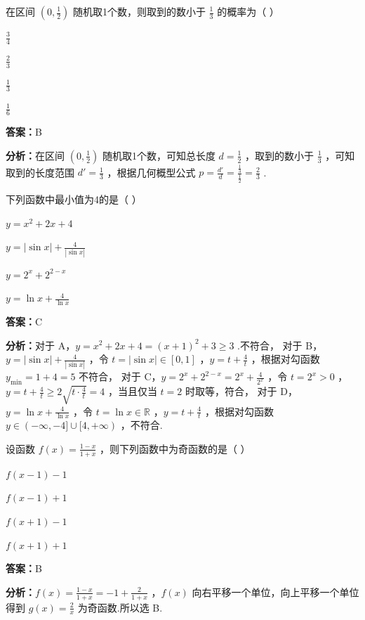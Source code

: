 \begin{question}[points=5]
在区间 $(0,\frac{1}{2})$ 随机取1个数，则取到的数小于 $\frac{1}{3}$ 的概率为（ ）
\begin{choices}
  \item $\frac{3}{4}$
  \item $\frac{2}{3}$
  \item $\frac{1}{3}$
  \item $\frac{1}{6}$
\end{choices}
\begin{solution}
\textbf{答案：}B

\textbf{分析：}在区间 $(0,\frac{1}{2})$ 随机取1个数，可知总长度 $d = \frac{1}{2}$ ，取到的数小于 $\frac{1}{3}$ ，可知取到的长度范围 $d' = \frac{1}{3}$ ，根据几何概型公式 $p = \frac{d'}{d} = \frac{\frac{1}{3}}{\frac{1}{2}} = \frac{2}{3}$ .
\end{solution}
\end{question}

\begin{question}[points=5]
下列函数中最小值为4的是（ ）
\begin{choices}
  \item $y = x^2 + 2x + 4$
  \item $y = |\sin x| + \frac{4}{|\sin x|}$
  \item $y = 2^x + 2^{2-x}$
  \item $y = \ln x + \frac{4}{\ln x}$
\end{choices}
\begin{solution}
\textbf{答案：}C

\textbf{分析：}对于 A，$y = x^2 + 2x + 4 = (x+1)^2 + 3 \ge 3$ .不符合，
对于 B，$y = |\sin x| + \frac{4}{|\sin x|}$ ，令 $t = |\sin x| \in [0,1]$ ，$y = t + \frac{4}{t}$ ，根据对勾函数 $y_{\min} = 1 + 4 = 5$ 不符合，
对于 C，$y = 2^x + 2^{2-x} = 2^x + \frac{4}{2^x}$ ，令 $t = 2^x > 0$ ，$y = t + \frac{4}{t} \ge 2\sqrt{t \cdot \frac{4}{t}} = 4$ ，当且仅当 $t=2$ 时取等，符合，
对于 D，$y = \ln x + \frac{4}{\ln x}$ ，令 $t = \ln x \in \mathbb{R}$ ，$y = t + \frac{4}{t}$ ，根据对勾函数 $y \in (-\infty, -4] \cup [4, +\infty)$ ，不符合.
\end{solution}
\end{question}

\begin{question}[points=5]
设函数 $f(x) = \frac{1-x}{1+x}$ ，则下列函数中为奇函数的是（ ）
\begin{choices}
  \item $f(x-1)-1$
  \item $f(x-1)+1$
  \item $f(x+1)-1$
  \item $f(x+1)+1$
\end{choices}
\begin{solution}
\textbf{答案：}B

\textbf{分析：}$f(x) = \frac{1-x}{1+x} = -1 + \frac{2}{1+x}$ ，$f(x)$ 向右平移一个单位，向上平移一个单位得到 $g(x) = \frac{2}{x}$ 为奇函数.所以选 B.
\end{solution}
\end{question}

